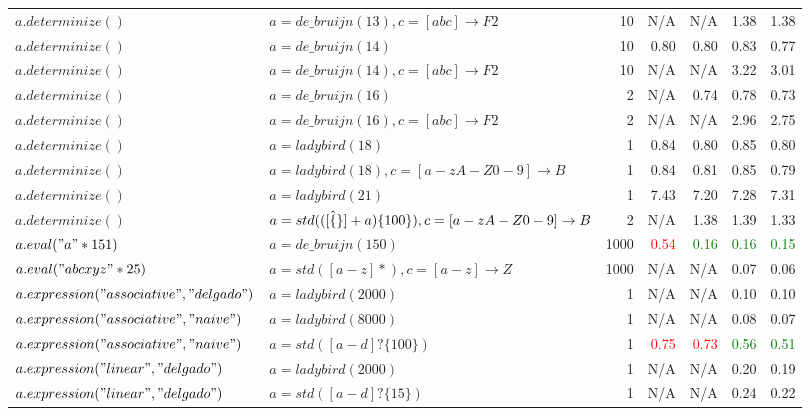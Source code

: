 \begin{tabular}{llr *{4}{r}}
$a.determinize()$ & $a = de\_bruijn(13), c = [abc] \rightarrow F2$ & 10 &   N/A &   N/A & \num{ 1.38} & \num{ 1.38} \\
$a.determinize()$ & $a = de\_bruijn(14)$ & 10 & \num{ 0.80} & \num{ 0.80} & \num{ 0.83} & \num{ 0.77} \\
$a.determinize()$ & $a = de\_bruijn(14), c = [abc] \rightarrow F2$ & 10 &   N/A &   N/A & \num{ 3.22} & \num{ 3.01} \\
$a.determinize()$ & $a = de\_bruijn(16)$ & 2 &   N/A & \num{ 0.74} & \num{ 0.78} & \num{ 0.73} \\
$a.determinize()$ & $a = de\_bruijn(16), c = [abc] \rightarrow F2$ & 2 &   N/A &   N/A & \num{ 2.96} & \num{ 2.75} \\
$a.determinize()$ & $a = ladybird(18)$ & 1 & \num{ 0.84} & \num{ 0.80} & \num{ 0.85} & \num{ 0.80} \\
$a.determinize()$ & $a = ladybird(18), c = [a-zA-Z0-9] \rightarrow B$ & 1 & \num{ 0.84} & \num{ 0.81} & \num{ 0.85} & \num{ 0.79} \\
$a.determinize()$ & $a = ladybird(21)$ & 1 & \num{ 7.43} & \num{ 7.20} & \num{ 7.28} & \num{ 7.31} \\
$a.determinize()$ & $a = std(([\hat\{\}]+a)\{100\}), c = [a-zA-Z0-9] \rightarrow B$ & 2 &   N/A & \num{ 1.38} & \num{ 1.39} & \num{ 1.33} \\
$a.eval("a"*151)$ & $a = de\_bruijn(150)$ & 1000 & \textcolor{red}{\num{ 0.54}} & \textcolor{green}{\num{ 0.16}} & \textcolor{green}{\num{ 0.16}} & \textcolor{green}{\num{ 0.15}} \\
$a.eval("abcxyz"*25)$ & $a = std([a-z]*), c = [a-z] \rightarrow Z$ & 1000 &   N/A &   N/A & \num{ 0.07} & \num{ 0.06} \\
$a.expression("associative", "delgado")$ & $a = ladybird(2000)$ & 1 &   N/A &   N/A & \num{ 0.10} & \num{ 0.10} \\
$a.expression("associative", "naive")$ & $a = ladybird(8000)$ & 1 &   N/A &   N/A & \num{ 0.08} & \num{ 0.07} \\
$a.expression("associative", "naive")$ & $a = std([a-d]?\{100\})$ & 1 & \textcolor{red}{\num{ 0.75}} & \textcolor{red}{\num{ 0.73}} & \textcolor{green}{\num{ 0.56}} & \textcolor{green}{\num{ 0.51}} \\
$a.expression("linear", "delgado")$ & $a = ladybird(2000)$ & 1 &   N/A &   N/A & \num{ 0.20} & \num{ 0.19} \\
$a.expression("linear", "delgado")$ & $a = std([a-d]?\{15\})$ & 1 &   N/A &   N/A & \num{ 0.24} & \num{ 0.22} \\

\end{tabular}
